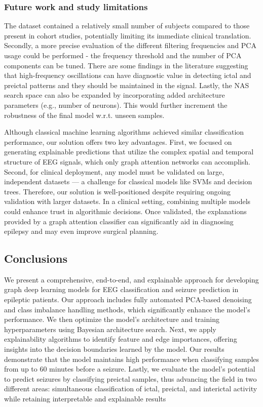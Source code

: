 \documentclass[a4paper,fleqn]{cas-sc}
\begin{document}
\subsubsection*{Future work and study limitations} The dataset contained a relatively small number of subjects compared to those present in cohort studies, potentially limiting its immediate clinical translation. Secondly, a more precise evaluation of the different filtering frequencies and PCA usage could be performed - the frequency threshold and the number of PCA components can be tuned. There are some findings in the literature suggesting that high-frequency oscillations can have diagnostic value in detecting ictal and preictal patterns \cite{jung2019hfoepilepsy} and they should be maintained in the signal. Lastly, the NAS search space can also be expanded by incorporating added architecture parameters (e.g., number of neurons). This would further increment the robustness of the final model w.r.t. unseen samples. 

Although classical machine learning algorithms achieved similar classification performance, our solution offers two key advantages. First, we focused on generating explainable predictions that utilize the complex spatial and temporal structure of EEG signals, which only graph attention networks can accomplish. Second, for clinical deployment, any model must be validated on large, independent datasets — a challenge for classical models like SVMs and decision trees. Therefore, our solution is well-positioned despite requiring ongoing validation with larger datasets. In a clinical setting, combining multiple models could enhance trust in algorithmic decisions. Once validated, the explanations provided by a graph attention classifier can significantly aid in diagnosing epilepsy and may even improve surgical planning.

\subsection*{Conclusions}
We present a comprehensive, end-to-end, and explainable approach for developing graph deep learning models for EEG classification and seizure prediction in epileptic patients. Our approach includes fully automated PCA-based denoising and class imbalance handling methods, which significantly enhance the model’s performance. We then optimize the model’s architecture and training hyperparameters using Bayesian architecture search. Next, we apply explainability algorithms to identify feature and edge importances, offering insights into the decision boundaries learned by the model. Our results demonstrate that the model maintains high performance when classifying samples from up to 60 minutes before a seizure. Lastly, we evaluate the model’s potential to predict seizures by classifying preictal samples, thus advancing the field in two different areas: simultaneous classification of ictal, preictal, and interictal activity while retaining interpretable and explainable results
\end{document}
